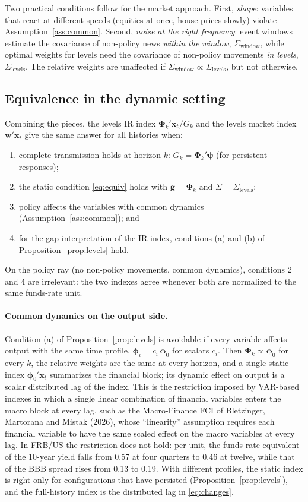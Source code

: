 \documentclass[11pt]{article}
\theoremstyle{definition}
\theoremstyle{remark}
\newcommand{\bpsi}{\boldsymbol{\psi}}
\newcommand{\bx}{\mathbf{x}}
\newcommand{\bg}{\mathbf{g}}
\newcommand{\bw}{\mathbf{w}}
\newcommand{\bphi}{\boldsymbol{\phi}}
\newcommand{\bPhi}{\boldsymbol{\Phi}}
\begin{document}
\noindent Two practical conditions follow for the market approach. First, \emph{shape}: variables that react at different speeds (equities at once, house prices slowly) violate Assumption~\ref{ass:common}. Second, \emph{noise at the right frequency}: event windows estimate the covariance of non-policy news \emph{within the window}, $\Sigma_{\text{window}}$, while optimal weights for levels need the covariance of non-policy movements \emph{in levels}, $\Sigma_{\text{levels}}$. The relative weights are unaffected if $\Sigma_{\text{window}}\propto\Sigma_{\text{levels}}$, but not otherwise.

\subsection{Equivalence in the dynamic setting}

Combining the pieces, the levels IR index $\bPhi_k'\bx_t/G_k$ and the levels market index $\bw'\bx_t$ give the same answer for all histories when:
\begin{enumerate}[leftmargin=2em]
\item complete transmission holds at horizon $k$: $G_k=\bPhi_k'\bpsi$ (for persistent responses);
\item the static condition \eqref{eq:equiv} holds with $\bg=\bPhi_k$ and $\Sigma=\Sigma_{\text{levels}}$;
\item policy affects the variables with common dynamics (Assumption~\ref{ass:common}); and
\item for the gap interpretation of the IR index, conditions (a) and (b) of Proposition~\ref{prop:levels} hold.
\end{enumerate}
On the policy ray (no non-policy movements, common dynamics), conditions 2 and 4 are irrelevant: the two indexes agree whenever both are normalized to the same funds-rate unit.

\paragraph{Common dynamics on the output side.} Condition (a) of Proposition~\ref{prop:levels} is avoidable if every variable affects output with the same time profile, $\bphi_i=c_i\,\bphi_0$ for scalars $c_i$. Then $\bPhi_k\propto\bphi_0$ for every $k$, the relative weights are the same at every horizon, and a single static index $\bphi_0'\bx_t$ summarizes the financial block; its dynamic effect on output is a scalar distributed lag of the index. This is the restriction imposed by VAR-based indexes in which a single linear combination of financial variables enters the macro block at every lag, such as the Macro-Finance FCI of Bletzinger, Martorana and Mistak (2026), whose ``linearity'' assumption requires each financial variable to have the same scaled effect on the macro variables at every lag. In FRB/US the restriction does not hold: per unit, the funds-rate equivalent of the 10-year yield falls from 0.57 at four quarters to 0.46 at twelve, while that of the BBB spread rises from 0.13 to 0.19. With different profiles, the static index is right only for configurations that have persisted (Proposition~\ref{prop:levels}), and the full-history index is the distributed lag in \eqref{eq:changes}.
\end{document}
